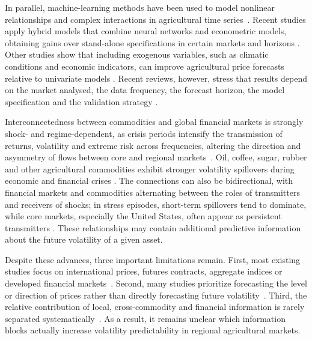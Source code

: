 \documentclass[a4paper,fleqn]{cas-sc}
\begin{document}
In parallel, machine-learning methods have been used to model nonlinear relationships and complex interactions in agricultural time series~\citep{105033941897,Zhang2025ClimateRealizedVolatility,Jin2024CoffeePriceML}. Recent studies apply hybrid models that combine neural networks and econometric models, obtaining gains over stand-alone specifications in certain markets and horizons \citep{Manogna2025HybridVolatility,S246822762500420X}. Other studies show that including exogenous variables, such as climatic conditions and economic indicators, can improve agricultural price forecasts relative to univariate models \citep{Nayak2024ExogenousAgricultural,Zhang2025ClimateRealizedVolatility,Pandit2024CEEMDANTDNN}. Recent reviews, however, stress that results depend on the market analysed, the data frequency, the forecast horizon, the model specification and the validation strategy \citep{Guindani2024AgriculturalForecasting}.

Interconnectedness between commodities and global financial markets is strongly shock- and regime-dependent, as crisis periods intensify the transmission of returns, volatility and extreme risk across frequencies, altering the direction and asymmetry of flows between core and regional markets~\citep{105008757196,84155181176,84901841234,85047926946}. Oil, coffee, sugar, rubber and other agricultural commodities exhibit stronger volatility spillovers during economic and financial crises \citep{Singh2026OilSoftCommoditySpillovers}. The connections can also be bidirectional, with financial markets and commodities alternating between the roles of transmitters and receivers of shocks; in stress episodes, short-term spillovers tend to dominate, while core markets, especially the United States, often appear as persistent transmitters \citep{Zhou2026CommodityConnectedness}. These relationships may contain additional predictive information about the future volatility of a given asset.

Despite these advances, three important limitations remain. First, most existing studies focus on international prices, futures contracts, aggregate indices or developed financial markets~\citep{Zhou2026CommodityConnectedness,Pandit2024CEEMDANTDNN,Brun2026GARCHCoffeeRisk}. Second, many studies prioritize forecasting the level or direction of prices rather than directly forecasting future volatility~\citep{Jin2024CoffeePriceML,Chaovanapoonphol2023CoffeeGARCHX,AliagaMiranda2026CoffeeShocks}. Third, the relative contribution of local, cross-commodity and financial information is rarely separated systematically~\citep{manogna2025dynamicnexus}. As a result, it remains unclear which information blocks actually increase volatility predictability in regional agricultural markets.
\end{document}
